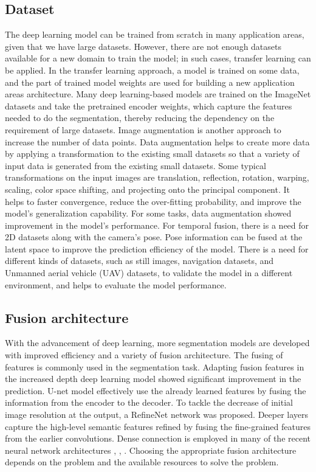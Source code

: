 		
    \subsection{Dataset}
	
	The deep learning model can be trained from scratch in many application areas, given that we have large datasets. However, there are not enough datasets available for a new domain to train the model; in such cases, transfer learning can be applied. In the transfer learning approach, a model is trained on some data, and the part of trained model weights are used for building a new application areas architecture. Many deep learning-based models are trained on the ImageNet datasets and take the pretrained encoder weights, which capture the features needed to do the segmentation, thereby reducing the dependency on the requirement of large datasets. Image augmentation is another approach to increase the number of data points. Data augmentation helps to create more data by applying a transformation to the existing small datasets so that a variety of input data is generated from the existing small datasets. Some typical transformations on the input images are translation, reflection, rotation, warping, scaling, color space shifting, and projecting onto the principal component. It helps to faster convergence, reduce the over-fitting probability, and improve the model's generalization capability. For some tasks, data augmentation showed improvement in the model's performance. For temporal fusion, there is a need for 2D datasets along with the camera's pose. Pose information can be fused at the latent space to improve the prediction efficiency of the model. There is a need for different kinds of datasets, such as still images, navigation datasets, and Unmanned aerial vehicle (UAV) datasets, to validate the model in a different environment, and helps to evaluate the model performance.  

    \subsection{Fusion architecture}
    
    With the advancement of deep learning, more segmentation models are developed with improved efficiency and a variety of fusion architecture. The fusing of features is commonly used in the segmentation task. Adapting fusion features in the increased depth deep learning model showed significant improvement in the prediction. U-net \cite{26_ronneberger2015u} model effectively use the already learned features by fusing the information from the encoder to the decoder. To tackle the decrease of initial image resolution at the output, a RefineNet \cite{27_lin2017refinenet} network was proposed. Deeper layers capture the high-level semantic features refined by fusing the fine-grained features from the earlier convolutions. Dense connection is employed in many of the recent neural network architectures \cite{28_jegou2017one}, \cite{29_iandola2014densenet}, \cite{30_yang2018denseaspp}. Choosing the appropriate fusion architecture depends on the problem and the available resources to solve the problem. 

